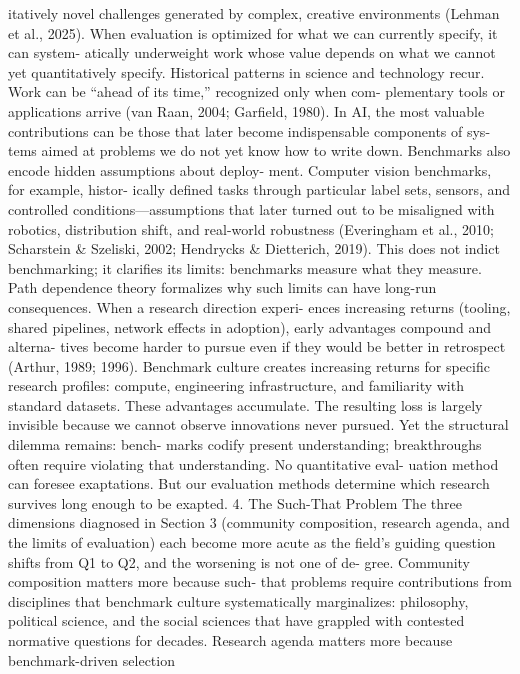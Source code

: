 itatively novel challenges generated by complex, creative
environments (Lehman et al., 2025). When evaluation is
optimized for what we can currently specify, it can system-
atically underweight work whose value depends on what we
cannot yet quantitatively specify.
Historical patterns in science and technology recur. Work
can be “ahead of its time,” recognized only when com-
plementary tools or applications arrive (van Raan, 2004;
Garfield, 1980). In AI, the most valuable contributions can
be those that later become indispensable components of sys-
tems aimed at problems we do not yet know how to write
down.
Benchmarks also encode hidden assumptions about deploy-
ment. Computer vision benchmarks, for example, histor-
ically defined tasks through particular label sets, sensors,
and controlled conditions—assumptions that later turned
out to be misaligned with robotics, distribution shift, and
real-world robustness (Everingham et al., 2010; Scharstein
\& Szeliski, 2002; Hendrycks \& Dietterich, 2019). This does
not indict benchmarking; it clarifies its limits: benchmarks
measure what they measure.
Path dependence theory formalizes why such limits can have
long-run consequences. When a research direction experi-
ences increasing returns (tooling, shared pipelines, network
effects in adoption), early advantages compound and alterna-
tives become harder to pursue even if they would be better in
retrospect (Arthur, 1989; 1996). Benchmark culture creates
increasing returns for specific research profiles: compute,
engineering infrastructure, and familiarity with standard
datasets. These advantages accumulate. The resulting loss
is largely invisible because we cannot observe innovations
never pursued. Yet the structural dilemma remains: bench-
marks codify present understanding; breakthroughs often
require violating that understanding. No quantitative eval-
uation method can foresee exaptations. But our evaluation
methods determine which research survives long enough to
be exapted.
4. The Such-That Problem
The three dimensions diagnosed in Section 3 (community
composition, research agenda, and the limits of evaluation)
each become more acute as the field’s guiding question
shifts from Q1 to Q2, and the worsening is not one of de-
gree. Community composition matters more because such-
that problems require contributions from disciplines that
benchmark culture systematically marginalizes: philosophy,
political science, and the social sciences that have grappled
with contested normative questions for decades. Research
agenda matters more because benchmark-driven selection
